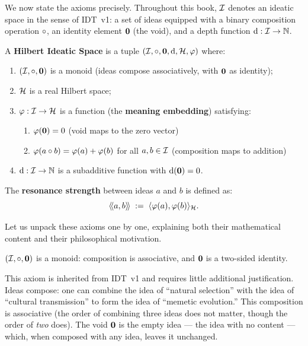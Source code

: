 We now state the axioms precisely. Throughout this book, $\mathcal{I}$ denotes an
ideatic space in the sense of IDT~v1: a set of ideas equipped with a
binary composition operation $\circ$, an identity element $\mathbf{0}$ (the void),
and a depth function $\operatorname{d} : \mathcal{I} \to \mathbb{N}$.

\begin{definition}
\label{def:hilbert-ideatic-space}
A \textbf{Hilbert Ideatic Space} is a tuple $(\mathcal{I}, \circ, \mathbf{0}, \operatorname{d},
\mathcal{H}, \varphi)$ where:
\begin{enumerate}
\item $(\mathcal{I}, \circ, \mathbf{0})$ is a monoid (ideas compose associatively, with
$\mathbf{0}$ as identity);
\item $\mathcal{H}$ is a real Hilbert space;
\item $\varphi : \mathcal{I} \to \mathcal{H}$ is a function (the \textbf{meaning embedding})
satisfying:
\begin{enumerate}
\item $\varphi(\mathbf{0}) = 0$ \hfill (void maps to the zero vector)
\item $\varphi(a \circ b) = \varphi(a) + \varphi(b)$ for all $a, b \in \mathcal{I}$
\hfill (composition maps to addition)
\end{enumerate}
\item $\operatorname{d} : \mathcal{I} \to \mathbb{N}$ is a subadditive function with $\operatorname{d}(\mathbf{0})
= 0$.
\end{enumerate}
The \textbf{resonance strength} between ideas $a$ and $b$ is defined as:
\[
  \langle\!\langle a, b \rangle\!\rangle \;:=\; \langle \varphi(a), \varphi(b) \rangle_{\mathcal{H}}.
\]
\end{definition}

Let us unpack these axioms one by one, explaining both their mathematical
content and their philosophical motivation.

\begin{axiom}
\label{ax:monoid}
$(\mathcal{I}, \circ, \mathbf{0})$ is a monoid: composition is associative, and $\mathbf{0}$
is a two-sided identity.
\end{axiom}

This axiom is inherited from IDT~v1 and requires little additional justification.
Ideas compose: one can combine the idea of ``natural selection'' with the idea
of ``cultural transmission'' to form the idea of ``memetic evolution.'' This
composition is associative (the order of combining three ideas does not matter,
though the order of \emph{two} does). The void $\mathbf{0}$ is the empty idea --- the
idea with no content --- which, when composed with any idea, leaves it unchanged.

